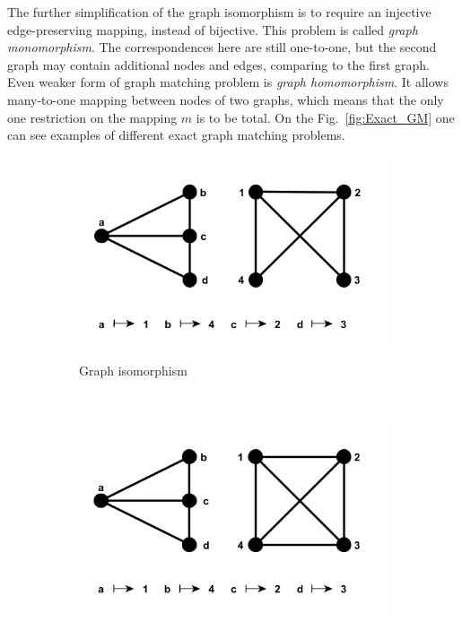 The further simplification of the graph isomorphism is to require an injective edge-preserving mapping, instead of bijective. This problem is called \emph{graph monomorphism}. The correspondences here are still one-to-one, but the second graph may contain additional nodes and edges, comparing to the first graph.
Even weaker form of graph matching problem is \emph{graph homomorphism}. It allows many-to-one mapping between nodes of two graphs, which means that the only one restriction on the mapping $m$ is to be total.
On the Fig.~\ref{fig:Exact_GM} one can see examples of different exact graph matching problems.
\begin{figure}[h!]
    \centering
    \begin{subfigure}[b]{0.3\textwidth}
        \includegraphics[width=\textwidth]{chapter1/fig/GI}
        \caption{Graph isomorphism}
        \label{fig:GI}
    \end{subfigure}
    ~
    \begin{subfigure}[b]{0.3\textwidth}
        \includegraphics[width=\textwidth]{chapter1/fig/monomorphism}

\end{subfigure}
\end{figure}
